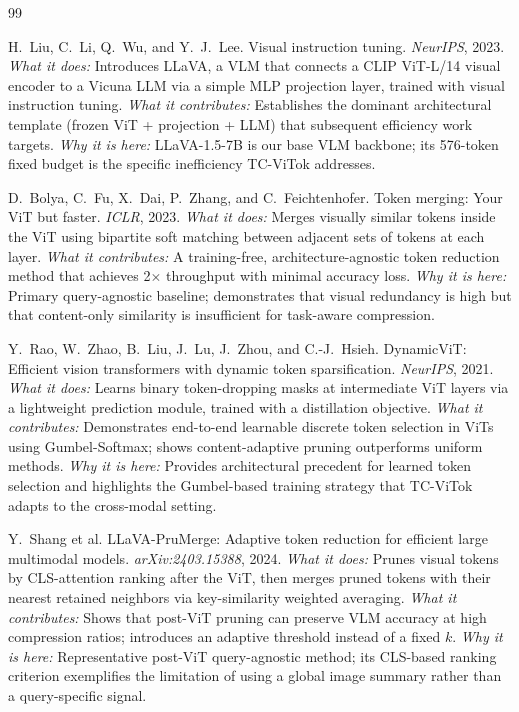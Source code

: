\documentclass[11pt,twocolumn]{article}
\begin{document}
\begin{thebibliography}{99}

H.~Liu, C.~Li, Q.~Wu, and Y.~J.~Lee.
\newblock Visual instruction tuning.
\newblock \textit{NeurIPS}, 2023.
\newblock \textit{What it does:} Introduces LLaVA, a VLM that connects a CLIP ViT-L/14 visual encoder to a Vicuna LLM via a simple MLP projection layer, trained with visual instruction tuning.
\newblock \textit{What it contributes:} Establishes the dominant architectural template (frozen ViT + projection + LLM) that subsequent efficiency work targets.
\newblock \textit{Why it is here:} LLaVA-1.5-7B is our base VLM backbone; its 576-token fixed budget is the specific inefficiency TC-ViTok addresses.

D.~Bolya, C.~Fu, X.~Dai, P.~Zhang, and C.~Feichtenhofer.
\newblock Token merging: Your ViT but faster.
\newblock \textit{ICLR}, 2023.
\newblock \textit{What it does:} Merges visually similar tokens inside the ViT using bipartite soft matching between adjacent sets of tokens at each layer.
\newblock \textit{What it contributes:} A training-free, architecture-agnostic token reduction method that achieves 2$\times$ throughput with minimal accuracy loss.
\newblock \textit{Why it is here:} Primary query-agnostic baseline; demonstrates that visual redundancy is high but that content-only similarity is insufficient for task-aware compression.

Y.~Rao, W.~Zhao, B.~Liu, J.~Lu, J.~Zhou, and C.-J.~Hsieh.
\newblock DynamicViT: Efficient vision transformers with dynamic token sparsification.
\newblock \textit{NeurIPS}, 2021.
\newblock \textit{What it does:} Learns binary token-dropping masks at intermediate ViT layers via a lightweight prediction module, trained with a distillation objective.
\newblock \textit{What it contributes:} Demonstrates end-to-end learnable discrete token selection in ViTs using Gumbel-Softmax; shows content-adaptive pruning outperforms uniform methods.
\newblock \textit{Why it is here:} Provides architectural precedent for learned token selection and highlights the Gumbel-based training strategy that TC-ViTok adapts to the cross-modal setting.

Y.~Shang et al.
\newblock LLaVA-PruMerge: Adaptive token reduction for efficient large multimodal models.
\newblock \textit{arXiv:2403.15388}, 2024.
\newblock \textit{What it does:} Prunes visual tokens by CLS-attention ranking after the ViT, then merges pruned tokens with their nearest retained neighbors via key-similarity weighted averaging.
\newblock \textit{What it contributes:} Shows that post-ViT pruning can preserve VLM accuracy at high compression ratios; introduces an adaptive threshold instead of a fixed $k$.
\newblock \textit{Why it is here:} Representative post-ViT query-agnostic method; its CLS-based ranking criterion exemplifies the limitation of using a global image summary rather than a query-specific signal.


\end{thebibliography}
\end{document}
